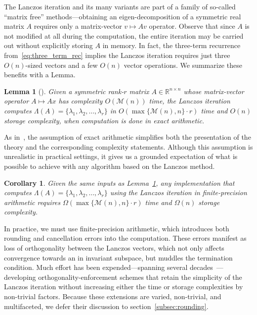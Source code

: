 \documentclass[10pt]{article}
\numberwithin{equation}{section}
\newcommand{\+}{%
	\raisebox{0.18ex}{\scaleobj{0.55}{+}}
}
\newtheorem{corollary}{Corollary}
\newtheorem{lemma}{Lemma}
\theoremstyle{definition}
\begin{document}
 The Lanczos iteration and its many variants are part of a family of so-called ``matrix free'' methods---obtaining an eigen-decomposition of a symmetric real matrix $A$ requires only a matrix-vector $v \mapsto Av$ operator. 
 Observe that since $A$ is not modified at all during the computation, the entire iteration may be carried out without explicitly storing $A$ in memory. 
 In fact, the three-term recurrence from~\eqref{eq:three_term_rec} implies the Lanczos iteration requires just three $O(n)$-sized vectors and a few $O(n)$ vector operations. We summarize these benefits with a Lemma. 
\begin{lemma}[\cite{parlett1994we, simon1984analysis}]\label{lemma:exact_arith_lanczos}
	Given a symmetric rank-$r$ matrix $A \in \mathbb{R}^{n \times n}$ whose matrix-vector operator $A \mapsto A x$ has complexity $O(\mathcal{M}(n))$ time, the Lanczos iteration computes $\Lambda(A) = \{ \lambda_1, \lambda_2, \dots, \lambda_r \}$ in $O(\max\{\mathcal{M}(n), n\}\cdot r)$ time and $O(n)$ storage complexity, when computation is done in exact arithmetic. 
\end{lemma}
\noindent As in~\cite{parlett1994we}, the assumption of exact arithmetic simplifies both the presentation of the theory and the corresponding complexity statements. 
Although this assumption is unrealistic in practical settings, it gives us a grounded expectation of what is possible to achieve with any algorithm based on the Lanczos method.
\begin{corollary}\label{cor:finite_arith_lanczos}
	Given the same inputs as Lemma~\ref{lemma:exact_arith_lanczos}, any implementation that computes $\Lambda(A) = \{ \lambda_1, \lambda_2, \dots, \lambda_r \}$ using the Lanczos iteration in finite-precision arithmetic requires $\Omega(\max\{\mathcal{M}(n), n\} \cdot r)$ time and $\Omega(n)$ storage complexity. 
\end{corollary}
\noindent
In practice, we must use finite-precision arithmetic, which introduces both rounding and cancellation errors into the computation.
These errors manifest as loss of orthogonality between the Lanczos vectors, which not only affects convergence towards an in invariant subspace, but muddles the termination condition. 
Much effort has been expended---spanning several decades~\cite{}---developing orthogonality-enforcement schemes that retain the simplicity of the Lanczos iteration without increasing either the time or storage complexities by non-trivial factors. 
Because these extensions are varied, non-trivial, and multifaceted, we defer their discussion to section~\ref{subsec:rounding}. 
\end{document}
